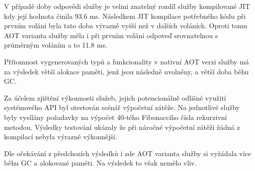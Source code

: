 V případě doby odpovědi služby je velmi znatelný rozdíl služby kompilované JIT kdy její hodnota činila 93.6 ms. Následkem JIT kompilace potřebného kódu při prvním volání byla tato doba výrazně vyšší než v dalších voláních. Oproti tomu AOT varianta služby měla i při prvním volání odpoveď srovnatelnou s průměrným voláním a to 11.8 ms.



Přítomnost vygenerovaných typů a funkcionality v nativní AOT verzi služby má za výsledek větší alokace paměti, jenž jsou následně uvolněny, a větší doba běhu GC.


Za účelem zjištění výkonnosti služeb, jejich potencionálně odlišné využití systémového API byl otestován scénář výpočetní zátěže. Na jednotlivé služby byly vysílány požadavky na výpočet 40-tého Fibonacciho čísla rekurzivní metodou. Výsledky testování ukázaly že při náročné výpočetní zátěži žádná z kompilací nebyla výrazně výkonnější.


Dle očekávání z předchozích výsledků i zde AOT varianta služby si vyžádala více běhu GC a alokované paměti. Na výsledek to však nemělo vliv.




